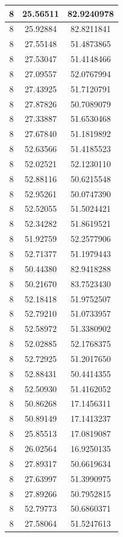 \documentclass[
]{book}
\begin{document}
\begin{tabular}{c|c|c}
\hline
8 & 25.56511 & 82.9240978\\
\hline
8 & 25.92884 & 82.8211841\\
\hline
8 & 27.55148 & 51.4873865\\
\hline
8 & 27.53047 & 51.4148466\\
\hline
8 & 27.09557 & 52.0767994\\
\hline
8 & 27.43925 & 51.7120791\\
\hline
8 & 27.87826 & 50.7089079\\
\hline
8 & 27.33887 & 51.6530468\\
\hline
8 & 27.67840 & 51.1819892\\
\hline
8 & 52.63566 & 51.4185523\\
\hline
8 & 52.02521 & 52.1230110\\
\hline
8 & 52.88116 & 50.6215548\\
\hline
8 & 52.95261 & 50.0747390\\
\hline
8 & 52.52055 & 51.5024421\\
\hline
8 & 52.34282 & 51.8619521\\
\hline
8 & 51.92759 & 52.2577906\\
\hline
8 & 52.71377 & 51.1979443\\
\hline
8 & 50.44380 & 82.9418288\\
\hline
8 & 50.21670 & 83.7523430\\
\hline
8 & 52.18418 & 51.9752507\\
\hline
8 & 52.79210 & 51.0733957\\
\hline
8 & 52.58972 & 51.3380902\\
\hline
8 & 52.02885 & 52.1768375\\
\hline
8 & 52.72925 & 51.2017650\\
\hline
8 & 52.88431 & 50.4414355\\
\hline
8 & 52.50930 & 51.4162052\\
\hline
8 & 50.86268 & 17.1456311\\
\hline
8 & 50.89149 & 17.1413237\\
\hline
8 & 25.85513 & 17.0819087\\
\hline
8 & 26.02564 & 16.9250135\\
\hline
8 & 27.89317 & 50.6619634\\
\hline
8 & 27.63997 & 51.3990975\\
\hline
8 & 27.89266 & 50.7952815\\
\hline
8 & 52.79773 & 50.6860371\\
\hline
8 & 27.58064 & 51.5247613\\

\end{tabular}
\end{document}
